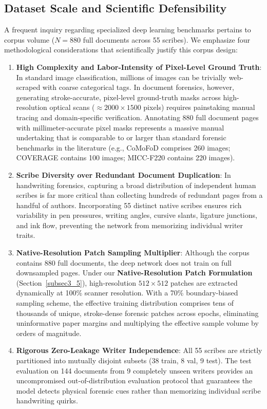 \documentclass[pdflatex,sn-mathphys-num,iicol]{sn-jnl}
\begin{document}
\subsection{Dataset Scale and Scientific Defensibility}\label{subsec3_3}
A frequent inquiry regarding specialized deep learning benchmarks pertains to corpus volume ($N = 880$ full documents across 55 scribes). We emphasize four methodological considerations that scientifically justify this corpus design:
\begin{enumerate}[1.]
    \item \textbf{High Complexity and Labor-Intensity of Pixel-Level Ground Truth}: In standard image classification, millions of images can be trivially web-scraped with coarse categorical tags. In document forensics, however, generating stroke-accurate, pixel-level ground-truth masks across high-resolution optical scans ($\approx 2000 \times 1500$ pixels) requires painstaking manual tracing and domain-specific verification. Annotating 880 full document pages with millimeter-accurate pixel masks represents a massive manual undertaking that is comparable to or larger than standard forensic benchmarks in the literature (e.g., CoMoFoD comprises 260 images; COVERAGE contains 100 images; MICC-F220 contains 220 images).
    \item \textbf{Scribe Diversity over Redundant Document Duplication}: In handwriting forensics, capturing a broad distribution of independent human scribes is far more critical than collecting hundreds of redundant pages from a handful of authors. Incorporating 55 distinct native scribes ensures rich variability in pen pressures, writing angles, cursive slants, ligature junctions, and ink flow, preventing the network from memorizing individual writer traits.
    \item \textbf{Native-Resolution Patch Sampling Multiplier}: Although the corpus contains 880 full documents, the deep network does not train on full downsampled pages. Under our \textbf{Native-Resolution Patch Formulation} (Section~\ref{subsec3_5}), high-resolution $512 \times 512$ patches are extracted dynamically at 100\% scanner resolution. With a 70\% boundary-biased sampling scheme, the effective training distribution comprises tens of thousands of unique, stroke-dense forensic patches across epochs, eliminating uninformative paper margins and multiplying the effective sample volume by orders of magnitude.
    \item \textbf{Rigorous Zero-Leakage Writer Independence}: All 55 scribes are strictly partitioned into mutually disjoint subsets (38 train, 8 val, 9 test). The test evaluation on 144 documents from 9 completely unseen writers provides an uncompromised out-of-distribution evaluation protocol that guarantees the model detects physical forensic cues rather than memorizing individual scribe handwriting quirks.
\end{enumerate}
\end{document}
